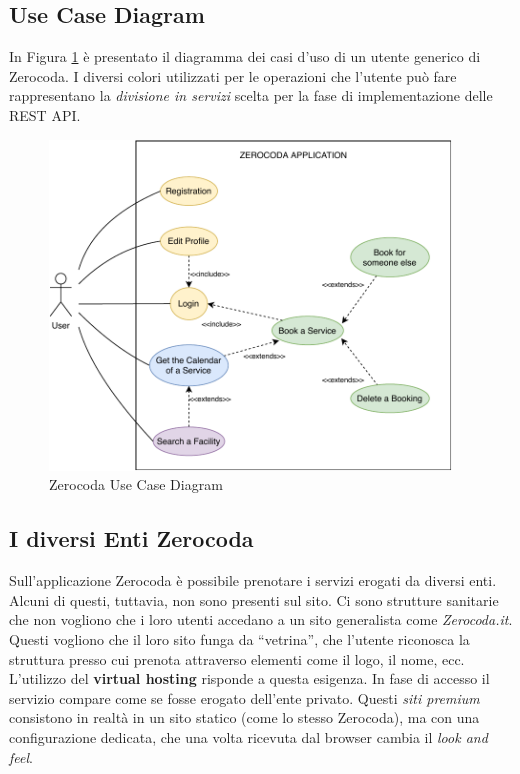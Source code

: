 \subsection{Use Case Diagram}
In Figura \ref{fig:zerocodausecase} è presentato il diagramma dei casi d'uso di un utente generico di Zerocoda. I diversi colori utilizzati per le operazioni che l'utente può fare rappresentano la \textit{divisione in servizi} scelta per la fase di implementazione delle REST API.
\begin{figure}[H]
    \centering
    \includegraphics[width=0.95\textwidth]{images/02_1_zerocoda_usecase.pdf}
    \caption{Zerocoda Use Case Diagram}
    \label{fig:zerocodausecase}
\end{figure}

\subsection{I diversi Enti Zerocoda}
Sull'applicazione Zerocoda è possibile prenotare i servizi erogati da diversi enti. Alcuni di questi, tuttavia, non sono presenti sul sito. Ci sono strutture sanitarie che non vogliono che i loro utenti accedano a un sito generalista come \emph{Zerocoda.it}. Questi vogliono che il loro sito funga da ``vetrina'', che l'utente riconosca la struttura presso cui prenota attraverso elementi come il logo, il nome, ecc. L'utilizzo del \textbf{virtual hosting} risponde a questa esigenza. In fase di accesso il servizio compare come se fosse erogato dell’ente privato. Questi \textit{siti premium} consistono in realtà in un sito statico (come lo stesso Zerocoda), ma con una configurazione dedicata, che una volta ricevuta dal browser cambia il \emph{look and feel}.

